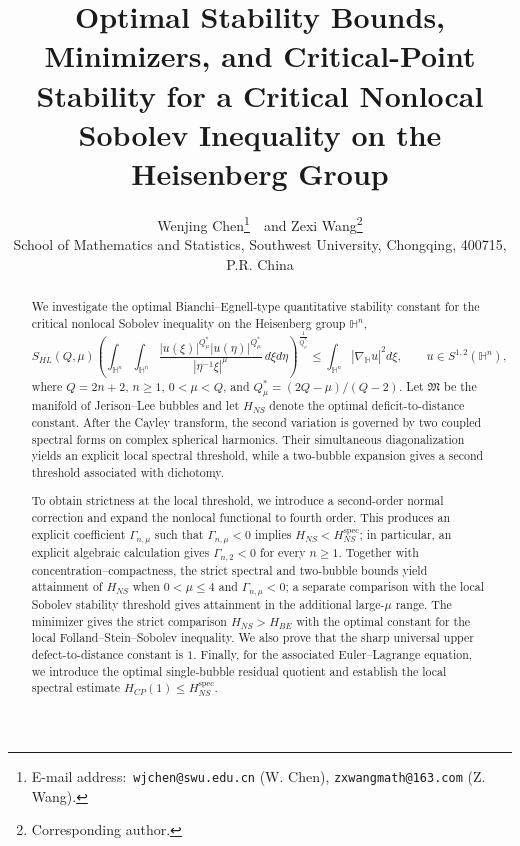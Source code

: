 \documentclass[11pt]{article}
\begin{document}
\title{{Optimal Stability Bounds, Minimizers, and Critical-Point Stability for a Critical Nonlocal Sobolev Inequality on the Heisenberg Group}}


\author{Wenjing Chen\footnote{E-mail address:\, {\tt wjchen@swu.edu.cn} (W. Chen), {\tt zxwangmath@163.com} (Z. Wang).}\ \ and Zexi Wang\footnote{Corresponding author.} \\
\footnotesize School of Mathematics and Statistics, Southwest University,
Chongqing, 400715, P.R. China}



\date{ }
\maketitle

\begin{abstract}
\begingroup
We investigate the optimal Bianchi--Egnell-type quantitative stability constant for the critical nonlocal Sobolev inequality on the Heisenberg group $\mathbb{H}^{n}$,
\begin{equation*}
 S_{HL}(Q,\mu)\left(\int_{\mathbb{H}^{n}}\int_{\mathbb{H}^{n}}
 \frac{|u(\xi)|^{Q^{\ast}_{\mu}}|u(\eta)|^{Q^{\ast}_{\mu}}}
 {|\eta^{-1}\xi|^{\mu}}\,d\xi d\eta\right)^{\frac{1}{Q^{\ast}_{\mu}}}
 \leq \int_{\mathbb{H}^{n}}|\nabla_{\mathbb{H}}u|^{2}d\xi,
 \qquad u\in S^{1,2}(\mathbb{H}^{n}),
\end{equation*}
where $Q=2n+2$, $n\ge1$, $0<\mu<Q$, and $Q^{\ast}_{\mu}=(2Q-\mu)/(Q-2)$. Let $\mathfrak M$ be the manifold of Jerison--Lee bubbles and let $H_{NS}$ denote the optimal deficit-to-distance constant. After the Cayley transform, the second variation is governed by two coupled spectral forms on complex spherical harmonics. Their simultaneous diagonalization yields an explicit local spectral threshold, while a two-bubble expansion gives a second threshold associated with dichotomy.

To obtain strictness at the local threshold, we introduce a second-order normal correction and expand the nonlocal functional to fourth order. This produces an explicit coefficient $\Gamma_{n,\mu}$ such that $\Gamma_{n,\mu}<0$ implies $H_{NS}<H_{NS}^{\mathrm{spec}}$; in particular, an explicit algebraic calculation gives $\Gamma_{n,2}<0$ for every $n\ge1$. Together with concentration--compactness, the strict spectral and two-bubble bounds yield attainment of $H_{NS}$ when $0<\mu\le4$ and $\Gamma_{n,\mu}<0$; a separate comparison with the local Sobolev stability threshold gives attainment in the additional large-$\mu$ range.
The minimizer gives the strict comparison $H_{NS}>H_{BE}$ with the optimal constant for the local Folland--Stein--Sobolev inequality. We also prove that the sharp universal upper defect-to-distance constant is $1$. Finally, for the associated Euler--Lagrange equation, we introduce the optimal single-bubble residual quotient and establish the local spectral estimate $H_{CP}(1)\le H_{NS}^{\mathrm{spec}}$.
\endgroup


\end{abstract}
\end{document}
